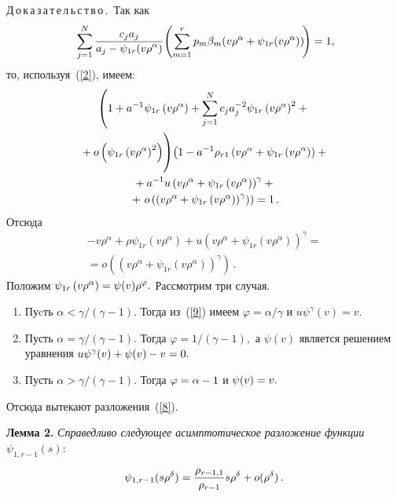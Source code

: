 \begin{multicols}{2}
\noindent
Д\,о\,к\,а\,з\,а\,т\,е\,л\,ь\,с\,т\,в\,о\,.\
Так как
$$
\sum\limits_{j=1}^N\displaystyle\frac{\displaystyle c_ja_j\mathstrut}{\displaystyle a_j-\psi_{1r}(v\rho^{\alpha})\mathstrut}
\!\left(\sum\limits_{m=1}^rp_m\beta_m(v\rho^{\alpha}+\psi_{1r}(v\rho^{\alpha}))\!\right)=1,\hspace*{-2.73624pt}
$$
то, используя~(\ref{2}), имеем:
\begin{multline*}
\left(1+a^{-1}\psi_{1r}\left(v\rho^{\alpha}\right)+
\sum\limits_{j=1}^Nc_ja_j^{-2}\psi_{1r}\left(v\rho^{\alpha}\right)^2
+{}\right.\\
\left.{}+o\left(\psi_{1r}\left(v\rho^{\alpha}\right)^2\right)
\vphantom{\sum\limits_{j=1}^N}
\!\right)\!
\left(1-a^{-1}\rho_{r1}\left(v\rho^{\alpha}+\psi_{1r}\left(v\rho^{\alpha}\right)\right)+{}\right.\\
\left.{}+
a^{-1}u\left(v\rho^{\alpha}+\psi_{1r}\left(v\rho^{\alpha}\right)\right)^{\gamma}+{}\right.\\
{}+\left.
o\left(\left(v\rho^{\alpha}+\psi_{1r}\left(v\rho^{\alpha}\right)\right)^{\gamma}\right)\right)
=1\,.
\end{multline*}
Отсюда
\begin{multline}
-v\rho^{\alpha}+\rho\psi_{1r}\left(v\rho^{\alpha}\right)+u\left(v\rho^{\alpha}+\psi_{1r}\left(v\rho^{\alpha}\right)\right)^{\gamma}
={}\\
{}=o\left(\left(v\rho^{\alpha}+\psi_{1r}\left(v\rho^{\alpha}\right)\right)^{\gamma}\right)\,.
\label{9}
\end{multline}
Положим $\psi_{1r}\left(v\rho^{\alpha}\right)\hm=\psi(v)\rho^{\varphi}.$ Рассмотрим три случая.
\begin{enumerate}[1.]
\item Пуcть $\alpha<{\gamma}/({\gamma-1}).$ Тогда из~(\ref{9}) имеем 
$\varphi={\alpha}/{\gamma}$ и $u\psi^{\gamma}(v)=v.$
\item Пусть $\alpha={\gamma}/({\gamma-1}).$ Тогда  $\varphi={1}/({\gamma-1}),$ 
а $\psi(v)$ является решением уравнения $u\psi^{\gamma}(v)\hm+\psi(v)\hm-v\hm=0.$
\item Пусть $\alpha>{\gamma}/({\gamma-1}).$ Тогда $\varphi\hm=\alpha\hm-1$ и $\psi(v)\hm=v.$
\end{enumerate}

Отсюда вытекают разложения~(\ref{8}).

\medskip

\noindent
\textbf{Лемма 2.} \textit{Справедливо следующее асимптотическое разложение 
функции} $\psi_{1,r-1}(s)$:
\begin{equation*}
\psi_{1,r-1}(s\rho^{\delta})=\displaystyle\frac{\displaystyle \rho_{r-1,1}\mathstrut}{\displaystyle \rho_{r-1}\mathstrut}s\rho^{\delta}+o(\rho^{\delta})\,.
\end{equation*}


\end{multicols}
